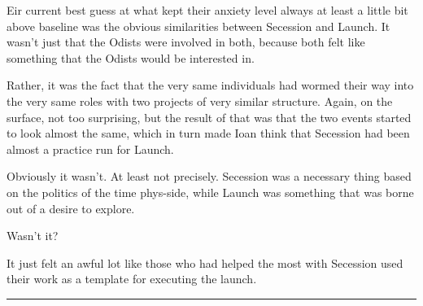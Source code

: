 \noindent Eir current best guess at what kept their anxiety level always at least a little bit above baseline was the obvious similarities between Secession and Launch. It wasn't just that the Odists were involved in both, because both felt like something that the Odists would be interested in.

Rather, it was the fact that the very same individuals had wormed their way into the very same roles with two projects of very similar structure. Again, on the surface, not too surprising, but the result of that was that the two events started to look almost the same, which in turn made Ioan think that Secession had been almost a practice run for Launch.

Obviously it wasn't. At least not precisely. Secession was a necessary thing based on the politics of the time phys-side, while Launch was something that was borne out of a desire to explore.

Wasn't it?

It just felt an awful lot like those who had helped the most with Secession used their work as a template for executing the launch.

\begin{center}\rule{0.5\linewidth}{0.5pt}\end{center}

